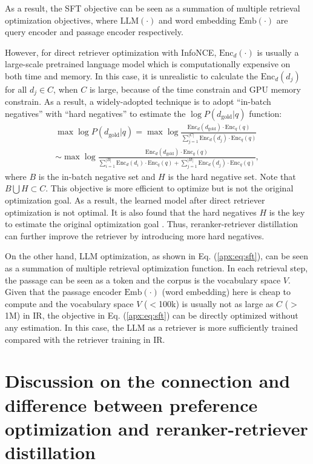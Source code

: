 As a result, the SFT objective can be seen as a summation of multiple retrieval optimization objectives, where $\text{LLM}(\cdot)$ and word embedding $\text{Emb}(\cdot)$ are query encoder and passage encoder respectively.

However, for direct retriever optimization with InfoNCE, $\text{Enc}_d(\cdot)$ is usually a large-scale pretrained language model which is computationally expensive on both time and memory.
In this case, it is unrealistic to calculate the $\text{Enc}_d(d_j)$ for all $d_j\in C$, when $C$ is large, because of the time constrain and GPU memory constrain.
As a result, a widely-adopted technique is to adopt ``in-batch negatives'' with ``hard negatives'' to estimate the $\log P(d_{\text{gold}}|q)$ function:
\begin{gather*}
    \max \log P(d_{\text{gold}}|q) = \max \log \frac{\text{Enc}_d(d_{\text{gold}}) \cdot\text{Enc}_q(q)}{\sum^{|C|}_{j=1} \text{Enc}_d(d_j) \cdot\text{Enc}_q(q)} \\
    \sim \max \log \frac{\text{Enc}_d(d_{\text{gold}}) \cdot\text{Enc}_q(q)}{\sum^{|B|}_{i=1} \text{Enc}_d(d_i) \cdot\text{Enc}_q(q) + \sum^{|H|}_{j=1} \text{Enc}_d(d_j) \cdot\text{Enc}_q(q)},
\end{gather*}
where $B$ is the in-batch negative set and $H$ is the hard negative set.
Note that $B\bigcup H \subset C$.
This objective is more efficient to optimize but is not the original optimization goal. As a result, the learned model after direct retriever optimization is not optimal.
It is also found that the hard negatives $H$ is the key to estimate the original optimization goal \citep{zhan2021optimizing}.
Thus, reranker-retriever distillation can further improve the retriever by introducing more hard negatives.

On the other hand, LLM optimization, as shown in Eq. (\ref{apx:eq:sft}), can be seen as a summation of multiple retrieval optimization function.
In each retrieval step, the passage can be seen as a token and the corpus is the vocabulary space $V$.
Given that the passage encoder $\text{Emb}(\cdot)$ (word embedding) here is cheap to compute and the vocabulary space $V$ ($<$100k) is usually not as large as $C$ ($>$1M) in IR, the objective in Eq. (\ref{apx:eq:sft}) can be directly optimized without any estimation.
In this case, the LLM as a retriever is more sufficiently trained compared with the retriever training in IR.


\section{Discussion on the connection and difference between preference optimization and reranker-retriever distillation}\label{apx:discuss2}

